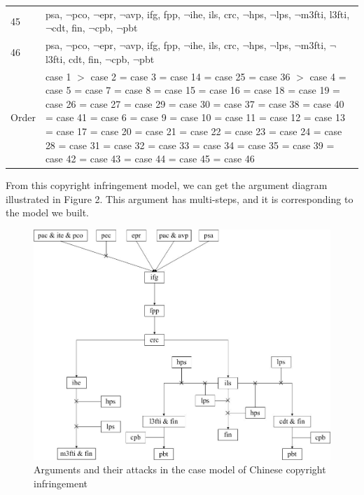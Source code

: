 \documentclass{IOS-Book-Article}
\begin{document}
\begin{longtable}{p{5mm}p{115mm}}
45	& psa, $\neg$pco, $\neg$epr, $\neg$avp, ifg, fpp, $\neg$ihe, ils, crc, $\neg$hps, $\neg$lps, $\neg$m3fti, l3fti, $\neg$cdt, fin, $\neg$cpb, $\neg$pbt \\
46	& psa, $\neg$pco, $\neg$epr, $\neg$avp, ifg, fpp, $\neg$ihe, ils, crc, $\neg$hps, $\neg$lps, $\neg$m3fti, $\neg$l3fti, cdt, fin, $\neg$cpb, $\neg$pbt \\ 
\hline
Order & case 1 $>$ case 2 = case 3 = case 14 = case 25 = case 36 $>$ case 4 = case 5 = case 7 = case 8 = case 15 = case 16 = case 18 = case 19 = case 26 = case 27 = case 29 = case 30 = case 37 = case 38 = case 40 = case 41 = case 6 = case 9 = case 10 = case 11 = case 12 = case 13 = case 17 = case 20 = case 21 = case 22 = case 23 = case 24 = case 28 = case 31 = case 32 = case 33 = case 34 = case 35 = case 39 = case 42 = case 43 = case 44 = case 45 = case 46\\
\hline
\end{longtable}
\normalsize

\normalsize
From this copyright infringement model, we can get the argument diagram illustrated in Figure 2. This argument has multi-steps, and it is corresponding to the model we built.

\begin{figure} [htbp]
\centering
\includegraphics [scale=0.32] {argument_diagram1.jpg}
\caption{Arguments and their attacks in the case model of Chinese copyright infringement}
\end{figure}
\end{document}
